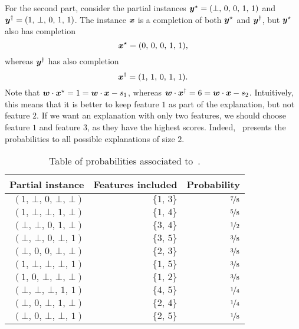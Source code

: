 \begin{example}
For the second part, consider the partial instances ${\bm{y}}^{\star} = (\bot, \, 0, \, 0, \, 1, \, 1)$ and ${\bm{y}}^{\dagger} = (1, \, \bot, \, 0, \, 1, \, 1)$. The instance ${\bm{x}}$ is a completion of both ${\bm{y}}^{\star}$ and ${\bm{y}}^{\dagger}$, but ${\bm{y}}^{\star}$ also has completion 
\[
    {\bm{x}}^{\star} = (0, \, 0, \, 0, \, 1, \, 1),
\]
whereas ${\bm{y}}^{\dagger}$ has also completion 
\[
    {\bm{x}}^{\dagger} = (1, \, 1, \, 0, \, 1, \, 1).
\]
Note that ${\bm{w}} \cdot  {\bm{x}}^{\star} = 1 = {\bm{w}} \cdot {\bm{x}} - s_1$, whereas ${\bm{w}} \cdot  {\bm{x}}^{\dagger} = 6 = {\bm{w}} \cdot {\bm{x}} - s_2$. Intuitively, this means that it is better to keep feature $1$ as part of the explanation, but not feature $2$. If we want an explanation with only two features, we should choose feature $1$ and feature $3$, as they have the highest scores. Indeed,~ presents the probabilities to all possible explanations of size $2$.
\begin{table}
    \caption{Table of probabilities associated to~.}\label{table:ex-greedy2}
    \centering
    \begin{tabular}{rrr}
        \toprule
        Partial instance & Features included & Probability\\ \midrule 
    $(1, \,\bot, \,0, \,\bot, \,\bot)$ & $\{1, \,3\}$ & $\nicefrac{ 7 }{ 8 }$\\
    $(1, \,\bot, \,\bot, \,1, \,\bot)$ & $\{1, \,4\}$ & $\nicefrac{ 5 }{ 8 }$\\
    $(\bot, \,\bot, \,0, \,1, \,\bot)$ & $\{3, \,4\}$ & $\nicefrac{ 1 }{ 2 }$\\
    $(\bot, \,\bot, \,0, \,\bot, \,1)$ & $\{3, \,5\}$ & $\nicefrac{ 3 }{ 8 }$\\
    $(\bot, \,0, \,0, \,\bot, \,\bot)$ & $\{2, \,3\}$ & $\nicefrac{ 3 }{ 8 }$\\
    $(1, \,\bot, \,\bot, \,\bot, \,1)$ & $\{1, \,5\}$ & $\nicefrac{ 3 }{ 8 }$\\
    $(1, \,0, \,\bot, \,\bot, \,\bot)$ & $\{1, \,2\}$ & $\nicefrac{ 3 }{ 8 }$\\
    $(\bot, \,\bot, \,\bot, \,1, \,1)$ & $\{4, \,5\}$ & $\nicefrac{ 1 }{ 4 }$\\
    $(\bot, \,0, \,\bot, \,1, \,\bot)$ & $\{2, \,4\}$ & $\nicefrac{ 1 }{ 4 }$\\
    $(\bot, \,0, \,\bot, \,\bot, \,1)$ & $\{2, \,5\}$ & $\nicefrac{ 1 }{ 8 }$\\
        \bottomrule
    \end{tabular}
\end{table}
\begin{table}

\end{table}
\end{example}
